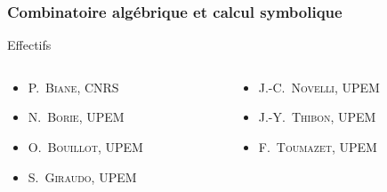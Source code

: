 \documentclass[]{beamer}
\begin{document}
\begin{frame}
  \frametitle{Combinatoire algébrique et calcul symbolique}

  \begin{block}{Effectifs}
      \begin{columns}
        \begin{column}{0.5\textwidth}
          \begin{itemize}
            \item \textsc{P.~Biane}, CNRS
            \item \textsc{N.~Borie}, UPEM
            \item \textsc{O.~Bouillot}, UPEM
            \item \textsc{S.~Giraudo}, UPEM
          \end{itemize}
        \end{column}

        \begin{column}{0.5\textwidth}
          \begin{itemize}
            \item \textsc{J.-C.~Novelli}, UPEM
            \item \alert{\textsc{J.-Y.~Thibon}, UPEM}
            \item \textsc{F.~Toumazet}, UPEM
          \end{itemize}
        \end{column}
      \end{columns}
  \end{block}
\end{frame}

\end{document}
